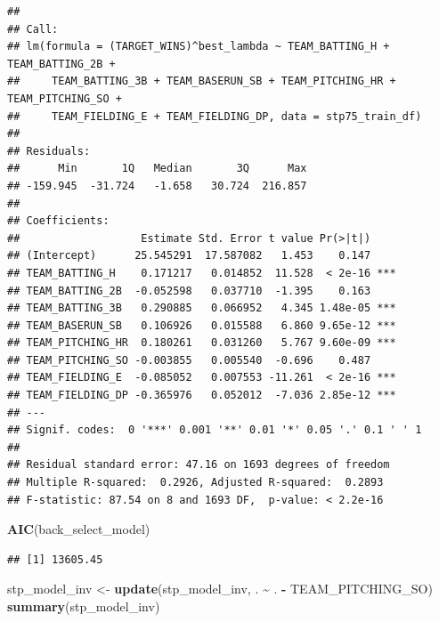\documentclass[
]{article}
\newenvironment{Shaded}{\begin{snugshade}}{\end{snugshade}}
\newcommand{\FunctionTok}[1]{\textcolor[rgb]{0.13,0.29,0.53}{\textbf{#1}}}
\newcommand{\NormalTok}[1]{#1}
\newcommand{\OtherTok}[1]{\textcolor[rgb]{0.56,0.35,0.01}{#1}}
\newcommand{\SpecialCharTok}[1]{\textcolor[rgb]{0.81,0.36,0.00}{\textbf{#1}}}
\begin{document}
\begin{verbatim}
## 
## Call:
## lm(formula = (TARGET_WINS)^best_lambda ~ TEAM_BATTING_H + TEAM_BATTING_2B + 
##     TEAM_BATTING_3B + TEAM_BASERUN_SB + TEAM_PITCHING_HR + TEAM_PITCHING_SO + 
##     TEAM_FIELDING_E + TEAM_FIELDING_DP, data = stp75_train_df)
## 
## Residuals:
##      Min       1Q   Median       3Q      Max 
## -159.945  -31.724   -1.658   30.724  216.857 
## 
## Coefficients:
##                   Estimate Std. Error t value Pr(>|t|)    
## (Intercept)      25.545291  17.587082   1.453    0.147    
## TEAM_BATTING_H    0.171217   0.014852  11.528  < 2e-16 ***
## TEAM_BATTING_2B  -0.052598   0.037710  -1.395    0.163    
## TEAM_BATTING_3B   0.290885   0.066952   4.345 1.48e-05 ***
## TEAM_BASERUN_SB   0.106926   0.015588   6.860 9.65e-12 ***
## TEAM_PITCHING_HR  0.180261   0.031260   5.767 9.60e-09 ***
## TEAM_PITCHING_SO -0.003855   0.005540  -0.696    0.487    
## TEAM_FIELDING_E  -0.085052   0.007553 -11.261  < 2e-16 ***
## TEAM_FIELDING_DP -0.365976   0.052012  -7.036 2.85e-12 ***
## ---
## Signif. codes:  0 '***' 0.001 '**' 0.01 '*' 0.05 '.' 0.1 ' ' 1
## 
## Residual standard error: 47.16 on 1693 degrees of freedom
## Multiple R-squared:  0.2926, Adjusted R-squared:  0.2893 
## F-statistic: 87.54 on 8 and 1693 DF,  p-value: < 2.2e-16
\end{verbatim}

\begin{Shaded}
\begin{Highlighting}[]
\FunctionTok{AIC}\NormalTok{(back\_select\_model)}
\end{Highlighting}
\end{Shaded}

\begin{verbatim}
## [1] 13605.45
\end{verbatim}

\begin{Shaded}
\begin{Highlighting}[]
\NormalTok{stp\_model\_inv }\OtherTok{\textless{}{-}} \FunctionTok{update}\NormalTok{(stp\_model\_inv, . }\SpecialCharTok{\textasciitilde{}}\NormalTok{ . }\SpecialCharTok{{-}}\NormalTok{ TEAM\_PITCHING\_SO)}
\FunctionTok{summary}\NormalTok{(stp\_model\_inv)}
\end{Highlighting}
\end{Shaded}
\end{document}
